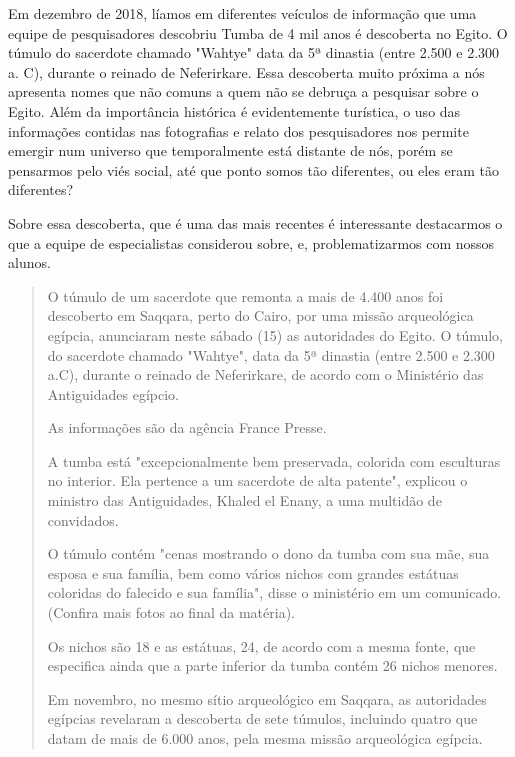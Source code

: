 \begin{refsection}
    Em dezembro de 2018, líamos em diferentes veículos de informação que uma equipe de pesquisadores descobriu Tumba de 4 mil anos é descoberta no Egito. O túmulo do sacerdote chamado "Wahtye" data da 5ª dinastia (entre 2.500 e 2.300 a. C), durante o reinado de Neferirkare. Essa descoberta muito próxima a nós apresenta nomes que não comuns a quem não se debruça a pesquisar sobre o Egito. Além da importância histórica é evidentemente turística, o uso das informações contidas nas fotografias e relato dos pesquisadores nos permite emergir num universo que temporalmente está distante de nós, porém se pensarmos pelo viés social, até que ponto somos tão diferentes, ou eles eram tão diferentes?  

    Sobre essa descoberta, que é uma das mais recentes é interessante destacarmos o que a equipe de especialistas considerou sobre, e, problematizarmos com nossos alunos.

    \begin{quotation}
        O túmulo de um sacerdote que remonta a mais de 4.400 anos foi descoberto em Saqqara, perto do Cairo, por uma missão arqueológica egípcia, anunciaram neste sábado (15) as autoridades do Egito. O túmulo, do sacerdote chamado "Wahtye", data da 5ª dinastia (entre 2.500 e 2.300 a.C), durante o reinado de Neferirkare, de acordo com o Ministério das Antiguidades egípcio. 

        As informações são da agência France Presse. 

        A tumba está "excepcionalmente bem preservada, colorida com esculturas no interior. Ela pertence a um sacerdote de alta patente", explicou o ministro das Antiguidades, Khaled el Enany, a uma multidão de convidados. 

        O túmulo contém "cenas mostrando o dono da tumba com sua mãe, sua esposa e sua família, bem como vários nichos com grandes estátuas coloridas do falecido e sua família", disse o ministério em um comunicado. (Confira mais fotos ao final da matéria). 

        Os nichos são 18 e as estátuas, 24, de acordo com a mesma fonte, que especifica ainda que a parte inferior da tumba contém 26 nichos menores. 

        Em novembro, no mesmo sítio arqueológico em Saqqara, as autoridades egípcias revelaram a descoberta de sete túmulos, incluindo quatro que datam de mais de 6.000 anos, pela mesma missão arqueológica egípcia. 

        \vspace{5mm}


\end{quotation}
\end{refsection}
